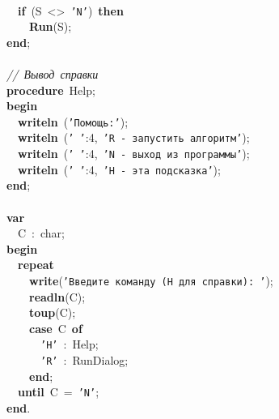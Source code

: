 \mbox{} \\
\mbox{}\ \ \textbf{if}\ (S\ \textless{}\textgreater{}\ \texttt{'N'})\ \textbf{then} \\
\mbox{}\ \ \ \ \textbf{Run}(S); \\
\mbox{}\textbf{end}; \\
\mbox{} \\
\mbox{}\textit{//\ Вывод\ справки} \\
\mbox{}\textbf{procedure}\ Help; \\
\mbox{}\textbf{begin} \\
\mbox{}\ \ \textbf{writeln}\ (\texttt{'Помощь:'}); \\
\mbox{}\ \ \textbf{writeln}\ (\texttt{'\ '}:4,\ \texttt{'R\ -\ запустить\ алгоритм'}); \\
\mbox{}\ \ \textbf{writeln}\ (\texttt{'\ '}:4,\ \texttt{'N\ -\ выход\ из\ программы'}); \\
\mbox{}\ \ \textbf{writeln}\ (\texttt{'\ '}:4,\ \texttt{'H\ -\ эта\ подсказка'}); \\
\mbox{}\textbf{end}; \\
\mbox{} \\
\mbox{}\textbf{var} \\
\mbox{}\ \ C\ :\ char; \\
\mbox{}\textbf{begin} \\
\mbox{}\ \ \textbf{repeat} \\
\mbox{}\ \ \ \ \textbf{write}(\texttt{'Введите\ команду\ (H\ для\ справки):\ '}); \\
\mbox{}\ \ \ \ \textbf{readln}(C); \\
\mbox{}\ \ \ \ \textbf{toup}(C); \\
\mbox{}\ \ \ \ \textbf{case}\ C\ \textbf{of} \\
\mbox{}\ \ \ \ \ \ \texttt{'H'}\ :\ Help; \\
\mbox{}\ \ \ \ \ \ \texttt{'R'}\ :\ RunDialog; \\
\mbox{}\ \ \ \ \textbf{end}; \\
\mbox{}\ \ \textbf{until}\ C\ =\ \texttt{'N'}; \\
\mbox{}\textbf{end}. \\
\mbox{} \\
\mbox{}
